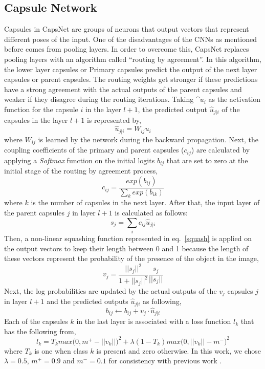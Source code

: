 \documentclass[a4paper,fleqn,usenatbib]{mnras}
\begin{document}
\subsection{Capsule Network}\label{CapsNet}
Capsules in CapsNet \citep{sabour2017dynamic} are groups of neurons that output vectors that represent different poses of the input. One of the disadvantages of the CNNs as mentioned before comes from pooling layers. In order to overcome this, CapsNet replaces pooling layers with an algorithm called ``routing by agreement''. In this algorithm, the lower layer capsules or Primary capsules predict the output of the next layer capsules or parent capsules. The routing weights get stronger if these predictions have a strong agreement with the actual outputs of the parent capsules and weaker if they disagree during the routing iterations. Taking $\^u_{i}$ as the activation function for the capsule $i$ in the layer $l+1$, the predicted output $\hat{u}_{j|i}$ of the capsules in the layer $l+1$ is represented by,
\begin{equation}
\hat{u}_{j|i} = W_{ij} u_{i}
\end{equation} 
where $W_{ij}$ is learned by the network during the backward propagation. Next, the coupling coefficients of the primary and parent capsules ($c_{ij}$) are calculated by applying a \textit{Softmax} function on the initial logits $b_{ij}$ that are set to zero at the initial stage of the routing by agreement process, 
\begin{equation}
c_{ij} = \frac{exp(b_{ij})}{\sum_{k} exp(b_{ik})}
\end{equation}  
where $k$ is the number of capsules in the next layer. After that, the input layer of the parent capsules $j$ in layer $l+1$ is calculated as follows:
\begin{equation}
s_{j} = \sum_{i} c_{ij} \hat{u}_{j|i}
\end{equation}
Then, a non-linear squashing function represented in eq.~\ref{squash} is applied on the output vectors to keep their length between 0 and 1 because the length of these vectors represent the probability of the presence of the object in the image,
\begin{equation}\label{squash}
v_{j} = \frac{|| s_{j}||^{2}}{1 + || s_{j}||^{2}} \frac{s_{j}}{||s_{j}||} 
\end{equation}
Next, the log probabilities are updated by the actual outputs of the $v_{j}$ capsules $j$ in layer $l+1$ and the predicted outputs $\hat{u}_{j|i}$ as following,
\begin{equation}
b_{ij} \leftarrow b_{ij} + v_{j} \cdot \hat{u}_{j|i}
\end{equation}
Each of the capsules $k$ in the last layer is associated with a loss function $l_{k}$ that has the following from, 
\begin{equation}
l_{k} = T_{k}max\Big(0, m^{+} - ||v_{k}||\Big)^{2} + \lambda(1-T_{k})max\Big(0, ||v_{k}|| - m^{-}\Big)^{2}
\end{equation}
where $T_{k}$ is one when class $k$ is present and zero otherwise. In this work, we chose $\lambda=0.5$, $m^{+}=0.9$ and $m^{-}=0.1$ for consistency with previous work \citep{sabour2017dynamic}.
\end{document}
